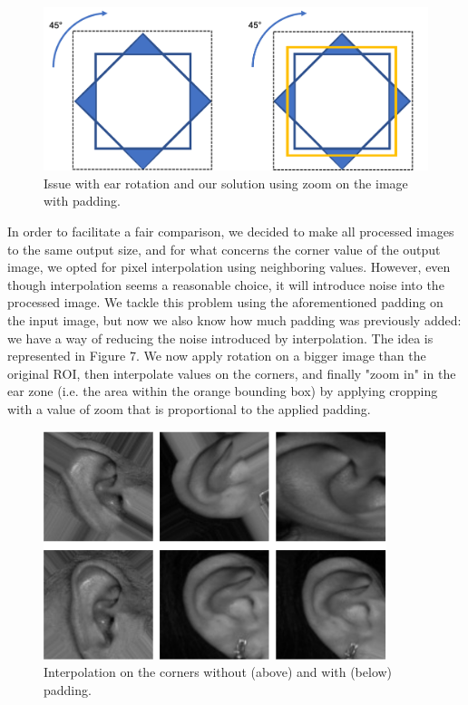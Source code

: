 \documentclass{article}
\begin{document}
\begin{figure}[H]
    \label{fig:rotation_issue}
    \begin{center}
        \includegraphics[width=12cm,keepaspectratio]{images/rotation_issue.png}
        \caption{Issue with ear rotation and our solution using zoom on the image with padding.}
    \end{center}
\end{figure}

In order to facilitate a fair comparison, we decided to make all processed images to the same output size,
and for what concerns the corner value of the output image, we opted for pixel interpolation using
neighboring values.
However, even though interpolation seems a reasonable choice, it will introduce noise into the processed image.
We tackle this problem using the aforementioned padding on the input image, but now we also know how much
padding was previously added: we have a way of reducing the noise introduced by interpolation. The idea is
represented in Figure 7. We now apply rotation on a bigger image than the original ROI, then interpolate
values on the corners, and finally "zoom in" in the ear zone (i.e. the area within the orange bounding box)
by applying cropping with a value of zoom that is proportional to the applied padding.

\begin{figure}[h]
    \label{fig:rotation_comparison}
    \begin{center}
        \includegraphics[width=10cm,keepaspectratio]{images/rotation_comparison.png}
        \caption{Interpolation on the corners without (above) and with (below) padding.}
    \end{center}
\end{figure}
\end{document}
